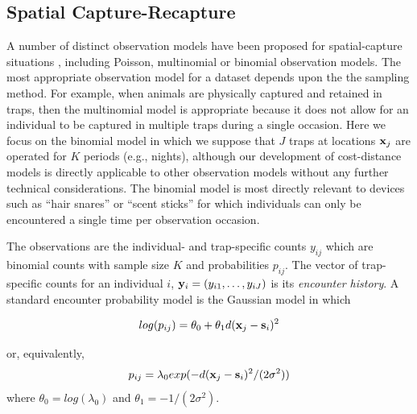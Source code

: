 \documentclass[12pt]{article}
\begin{document}
\begin{spacing}{1.8}
\section{Spatial Capture-Recapture}

A number of distinct observation models have been proposed for
spatial-capture situations \citep{borchers_efford:2008,
  royle_etal:2009ecol, efford_etal:2009ecol}, including Poisson,
multinomial or binomial observation models. The most appropriate
observation model for a dataset depends upon the the sampling method.
For example, when animals are physically captured and retained in
traps, then the multinomial model is appropriate because it does not
allow for an individual to be captured in multiple traps during a
single occasion. Here we focus on the binomial model in which we
suppose that $J$ traps at locations ${\bf x}_{j}$ are operated for $K$
periods (e.g., nights), although our development of cost-distance
models is directly applicable to other observation models without any
further technical considerations. The binomial model is most directly
relevant to devices such as ``hair snares''
\citep{woods_etal:1999,gardner_etal:2010jwm} or ``scent sticks''
\citep{kery_etal:2010} for which individuals can only be encountered a
single time per observation occasion.

The observations are the individual- and trap-specific counts $y_{ij}$
which are binomial counts with sample size $K$ and probabilities
$p_{ij}$. The vector of trap-specific counts for an individual $i$,
 ${\bf y}_{i} = (y_{i1},\ldots,y_{iJ})$ is its {\it encounter history}.
A standard encounter probability model
\citep{borchers_efford:2008} is the Gaussian model in which

\begin{equation}
log(p_{ij})= \theta_{0} + \theta_{1} d({\bf x}_{j} - {\bf s}_{i})^{2}
\label{eq.encounter}
\end{equation}

{\flushleft or, equivalently, }
\[
p_{ij} = \lambda_{0} exp(-  d({\bf x}_{j} - {\bf s}_{i})^{2}
/(2\sigma^{2}) )
\]
where $\theta_{0} = log(\lambda_{0})$ and $\theta_{1} =
-1/(2\sigma^2)$.



\end{spacing}
\end{document}
